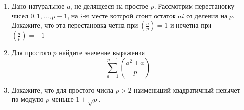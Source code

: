 \documentclass{article}
\begin{document}
\begin{enumerate}[label*=\protect\fbox{\arabic{enumi}}]
\item Дано натуральное $a$, не делящееся на простое $p$. Рассмотрим перестановку чисел $0, 1, \ldots, p-1$, на $i$-м месте которой стоит остаток $ai$ от деления на $p$. Докажите, что эта перестановка четна при $\left(\frac{a}{p}\right) = 1$ и нечетна при $\left(\frac{a}{p}\right) = -1$

\item Для простого $p$ найдите значение выражения $$\sum\limits_{a = 1}^{p-1}\left(\frac{a^2 + a}{p}\right)$$

\item Докажите, что для простого числа $p > 2$ наименьший квадратичный невычет по модулю $p$ меньше $1 + \sqrt{p}$.

	
\end{enumerate}
\end{document}
